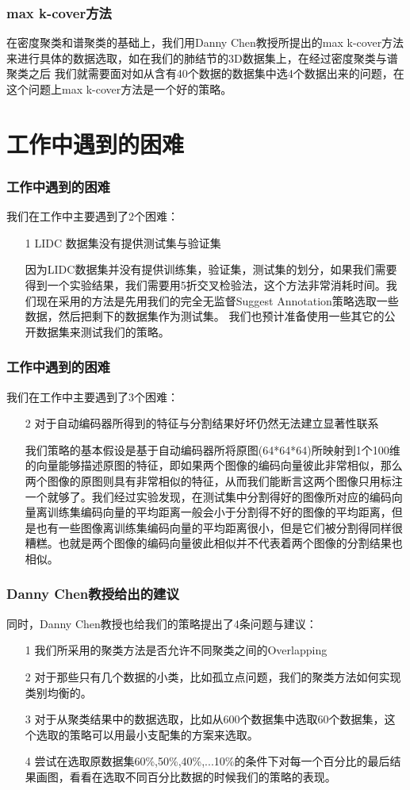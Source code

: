 \documentclass[9pt]{beamer}
\begin{document}
\begin{frame}[fragile]
	\frametitle{max k-cover方法}
	在密度聚类和谱聚类的基础上，我们用Danny Chen教授所提出的max k-cover方法来进行具体的数据选取，如在我们的肺结节的3D数据集上，在经过密度聚类与谱聚类之后
	我们就需要面对如从含有40个数据的数据集中选4个数据出来的问题，在这个问题上max k-cover方法是一个好的策略。
\end{frame}


\section*{工作中遇到的困难}

\begin{frame}[fragile]
	\frametitle{工作中遇到的困难}
	我们在工作中主要遇到了2个困难：
	\begin{itemize}
	\item[1] LIDC 数据集没有提供测试集与验证集

	因为LIDC数据集并没有提供训练集，验证集，测试集的划分，如果我们需要得到一个实验结果，我们需要用5折交叉检验法，这个方法非常消耗时间。我们现在采用的方法是先用我们的完全无监督Suggest Annotation策略选取一些数据，然后把剩下的数据集作为测试集。
	我们也预计准备使用一些其它的公开数据集来测试我们的策略。
	\end{itemize}
\end{frame}

\begin{frame}[fragile]
	\frametitle{工作中遇到的困难}
	我们在工作中主要遇到了3个困难：
	\begin{itemize}
	\item[2] 对于自动编码器所得到的特征与分割结果好坏仍然无法建立显著性联系
	
	我们策略的基本假设是基于自动编码器所将原图(64*64*64)所映射到1个100维的向量能够描述原图的特征，即如果两个图像的编码向量彼此非常相似，那么两个图像的原图则具有非常相似的特征，从而我们能断言这两个图像只用标注一个就够了。我们经过实验发现，在测试集中分割得好的图像所对应的编码向量离训练集编码向量的平均距离一般会小于分割得不好的图像的平均距离，但是也有一些图像离训练集编码向量的平均距离很小，但是它们被分割得同样很糟糕。也就是两个图像的编码向量彼此相似并不代表着两个图像的分割结果也相似。
	\end{itemize}
\end{frame}



\begin{frame}[fragile]
	\frametitle{Danny Chen教授给出的建议}
	同时，Danny Chen教授也给我们的策略提出了4条问题与建议：
	\begin{itemize}
	\item[1] 我们所采用的聚类方法是否允许不同聚类之间的Overlapping
	\item[2] 对于那些只有几个数据的小类，比如孤立点问题，我们的聚类方法如何实现类别均衡的。
	\item[3] 对于从聚类结果中的数据选取，比如从600个数据集中选取60个数据集，这个选取的策略可以用最小支配集的方案来选取。
	\item[4] 尝试在选取原数据集60\%,50\%,40\%,...10\%的条件下对每一个百分比的最后结果画图，看看在选取不同百分比数据的时候我们的策略的表现。
	\end{itemize}
\end{frame}
\end{document}

